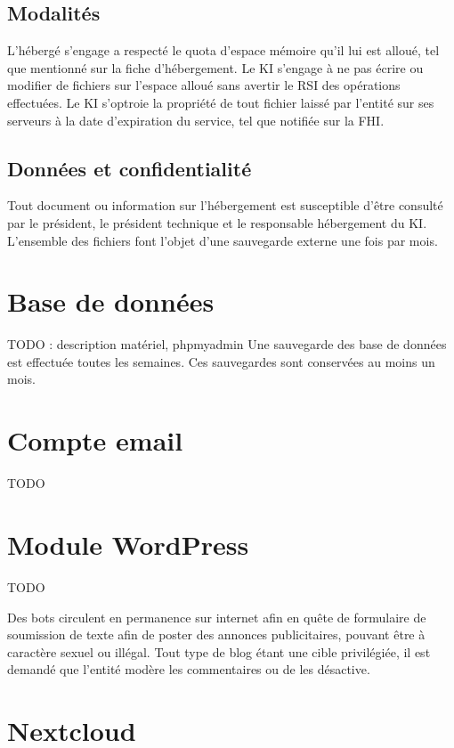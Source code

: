 \documentclass{charteki019}
\begin{document}
\subsection{Modalités}

L'hébergé s'engage a respecté le quota d'espace mémoire qu'il lui est alloué, tel que mentionné sur la fiche d'hébergement.
Le KI s'engage à ne pas écrire ou modifier de fichiers sur l'espace alloué sans avertir le RSI des opérations effectuées.
Le KI s'optroie la propriété de tout fichier laissé par l'entité sur ses serveurs à la date d'expiration du service, tel que notifiée sur la FHI.

\subsection{Données et confidentialité}

Tout document ou information sur l'hébergement est susceptible d'être consulté par le président, le président technique et le responsable hébergement du KI.
L'ensemble des fichiers font l'objet d'une sauvegarde externe une fois par mois.

\section{Base de données}

TODO : description matériel, phpmyadmin
Une sauvegarde des base de données est effectuée toutes les semaines. Ces sauvegardes sont conservées au moins un mois.

\section{Compte email}

TODO

\section{Module WordPress}

TODO

Des bots circulent en permanence sur internet afin en quête de formulaire de soumission de texte afin de poster des annonces publicitaires, pouvant être à caractère sexuel ou illégal. Tout type de blog étant une cible privilégiée, il est demandé que l'entité modère les commentaires ou de les désactive.

\section{Nextcloud}
\end{document}
